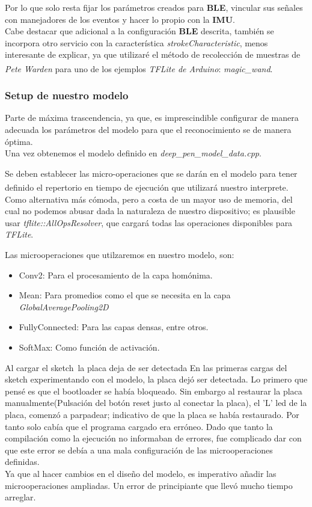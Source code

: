 Por lo que solo resta fijar los parámetros creados para \textbf{BLE},
vincular sus señales con manejadores de los eventos y hacer lo propio
con la \textbf{IMU}.\\
Cabe destacar que adicional a la configuración \textbf{BLE} descrita, también
se incorpora otro servicio con la característica \textit{strokeCharacteristic},
menos interesante de explicar, ya que utilizaré el método de recolección de
muestras de \textit{Pete Warden} para uno de los ejemplos
\textit{TFLite de Arduino}: \textit{magic\_wand}\textsuperscript{\cite{petewardenmw}}.

\subsubsection{Setup de nuestro modelo}
Parte de máxima trascendencia, ya que, es imprescindible configurar de
manera adecuada los parámetros del modelo para que el reconocimiento
se de manera óptima.\\
Una vez obtenemos el modelo definido en \textit{deep\_pen\_model\_data.cpp}.

Se deben establecer las micro-operaciones que se darán en el modelo
para tener definido el repertorio en tiempo de ejecución que utilizará
nuestro interprete.\textsuperscript{\cite{intro-tensor-micro}}
Como alternativa más cómoda, pero a costa de un mayor uso de memoria,
del cual no podemos abusar dada la naturaleza de nuestro dispositivo;
es plausible usar \textit{tflite::AllOpsResolver}, que cargará todas las
operaciones disponibles para \textit{TFLite}.

Las microoperaciones que utilzaremos en nuestro modelo, son:
\begin{itemize}
    \itemsep0em 
    \item Conv2: Para el procesamiento de la capa homónima.
    \item Mean: Para promedios como el que se necesita en la capa \textit{GlobalAveragePooling2D}
    \item FullyConnected: Para las capas densas, entre otros.
    \item SoftMax: Como función de activación.
\end{itemize}

\begin{problemas}{Al cargar el sketch\, la placa deja de ser detectada}
    En las primeras cargas del sketch experimentando con el modelo, la placa
    dejó ser detectada. Lo primero que pensé es que el bootloader se había
    bloqueado. Sin embargo al restaurar la placa manualmente({\small Pulsación
    del botón reset justo al conectar la placa}), el 'L' led de la placa,
    comenzó a parpadear; indicativo de que la placa se había restaurado.
    Por tanto solo cabía que el programa cargado era erróneo.
    Dado que tanto la compilación como la ejecución no informaban de errores,
    fue complicado dar con que este error se debía a una mala configuración
    de las microoperaciones definidas.\\Ya que al hacer cambios en el diseño
    del modelo, es imperativo añadir las microoperaciones ampliadas.
    Un error de principiante que llevó mucho tiempo arreglar.
\end{problemas}

